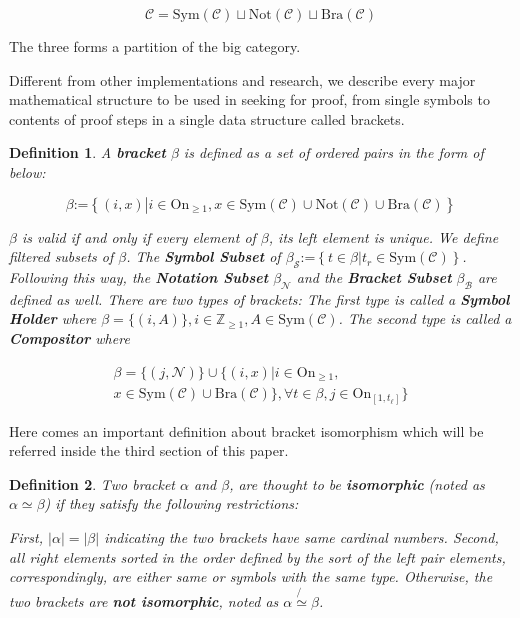 \documentclass{aims}
\newtheorem{definition}{Definition}	%
\numberwithin{theorem}{section}	%
\numberwithin{axiom}{section}	%
\numberwithin{definition}{section}	%
\begin{document}
\begin{equation}
	\mathcal{C}=\text{Sym}(\mathcal{C})\sqcup \text{Not}(\mathcal{C})\sqcup \text{Bra}(\mathcal{C})
\end{equation}

The three forms a partition of the big category.

Different from other implementations and research, we describe every major mathematical structure to be used in seeking for proof, from single symbols to contents of proof steps in a single data structure called brackets.

\begin{definition}
	A \textbf{ bracket} \(\beta\) is defined as a set of ordered pairs in the form of below:
	
	\begin{equation}
		\beta \text{:=}\left\{(i,x)\left|i\in \text{On}_{\geq 1}\right.,x\in \text{Sym}(\mathcal{C})\cup \text{Not}(\mathcal{C})\cup \text{Bra}(\mathcal{C})\right\}
	\end{equation}
	
	\(\beta\) is valid if and only if every element of \(\beta\), its left element is unique. We define filtered subsets of \(\beta\). The \textbf{ Symbol Subset} of \(\beta _{\mathcal{S}}\text{:=}\left\{t\in \beta \left|t_{\mathit{r}}\in \text{Sym}(\mathcal{C})\right.\right\}\). Following this way, the \textbf{ Notation Subset} \(\beta _{\mathcal{N}}\) and the \textbf{ Bracket Subset} \(\beta _{\mathcal{B}}\) are defined as well. There are two types of brackets: The first type is called a \textbf{ Symbol Holder} where \(\beta =\{(i,A)\},i\in \mathbb{Z}_{\geq 1},A\in \text{Sym}(\mathcal{C})\). The second type is called a \textbf{ Compositor} where
	
	\begin{equation}
	\begin{split}
		\beta =\{(j,\mathcal{N})\}\cup \{(i,x)|i\in \text{On}_{\geq 1},\\ x\in \text{Sym}(\mathcal{C})\cup \text{Bra}(\mathcal{C})\},\forall
		t\in \beta ,j\in \text{On}_{[1,t_{\ell }]}\}
	\end{split}
	\end{equation}
\end{definition}

Here comes an important definition about bracket isomorphism which will be referred inside the third section of this paper.

\begin{definition}
	Two bracket \(\alpha\) and \(\beta\), are thought to be \textbf{ isomorphic} (noted as \(\alpha \simeq \beta\)) if they satisfy the following restrictions:
	
	First, \(|\alpha |=|\beta |\) indicating the two brackets have same cardinal numbers. Second, all right elements sorted in the order defined by the sort of the left pair elements, correspondingly, are either same or symbols with the same type. Otherwise, the two brackets are \textbf{ not isomorphic}, noted as \(\alpha \not{\simeq}\beta\).
\end{definition}
\end{document}
